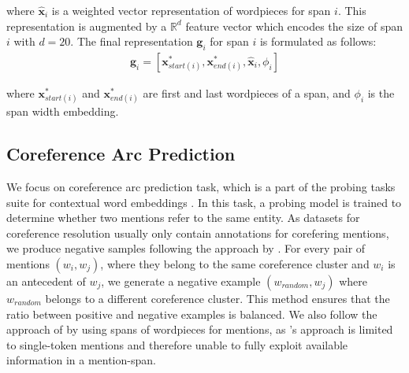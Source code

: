 \documentclass[11pt]{article}
\begin{document}
where $\hat{\pmb{x}}_{i}$ is a weighted vector representation of wordpieces for span $i$. This representation is augmented by a $\mathbb{R}^{d}$ feature vector which encodes the size of span $i$ with $d = 20$. The final representation $\pmb{g}_{i}$ for span $i$ is formulated as follows:
\begin{align}
\pmb{g}_{i} = [\pmb{x}_{start(i)}^{*}, \pmb{x}_{end(i)}^{*}, \hat{\pmb{x}}_{i}, \phi_{i}]
\end{align}  

where $\pmb{x}_{start(i)}^{*}$ and $\pmb{x}_{end(i)}^{*}$ are first and last wordpieces of a span, and $\phi_{i}$ is the span width embedding.

\subsection{Coreference Arc Prediction}
\label{subsection:corefarc}



We focus on coreference arc prediction task, which is a part of the probing tasks suite for contextual word embeddings \parencite{liu2019linguistic, tenney2019context}. In this task, a probing model is trained to determine whether two mentions refer to the same entity. As datasets for coreference resolution usually only contain annotations for corefering mentions, we produce negative samples following the approach by \textcite{liu2019linguistic}. For every pair of mentions $(w_{i}, w_{j})$, where they belong to the same coreference cluster and $w_{i}$ is an antecedent of $w_{j}$, we generate a negative example $(w_{random}, w_{j})$ where $w_{random}$ belongs to a different coreference cluster. This method ensures that the ratio between positive and negative examples is balanced. We also follow the approach of \textcite{tenney2019context} by using spans of wordpieces for mentions, as \textcite{liu2019linguistic}'s approach is limited to single-token mentions and therefore unable to fully exploit available information in a mention-span.
\end{document}
